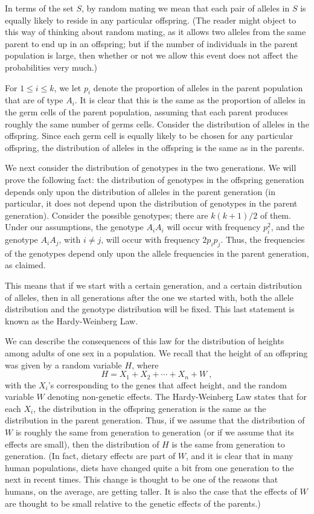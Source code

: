 In terms of the set $S$, by random mating we mean that each pair of alleles in $S$ is equally
likely to reside in any particular offspring.  (The reader might object to this way of thinking
about random mating, as it allows two alleles from the same parent to end up in an offspring; but
if the number of individuals in the parent population is large, then whether or not we allow this
event does not affect the probabilities very much.)  
\par
For $1 \le i \le k$, we let $p_i$ denote the proportion of alleles in the parent population that
are of type $A_i$.  It is clear that this is the same as the proportion of alleles in the germ
cells of the parent population, assuming that each parent produces roughly the same number of
germs cells.  Consider the distribution of alleles in the offspring.  Since each germ cell is
equally likely to be chosen for any particular offspring, the distribution of alleles in the
offspring is the same as in the parents.
\par
We next consider the distribution of genotypes in the two generations.  We will prove the
following fact:  the distribution of genotypes in the offspring generation depends only upon the
distribution of alleles in the parent generation (in particular, it does not depend upon the
distribution of genotypes in the parent generation).  Consider the possible genotypes; there are
$k(k+1)/2$ of them.  Under our assumptions, the genotype $A_iA_i$ will occur with frequency
$p_i^2$, and the genotype $A_iA_j$, with $i \ne j$, will occur with frequency $2p_ip_j$.  Thus,
the frequencies of the genotypes depend only upon the allele frequencies in the parent generation,
as claimed.
\par
This means that if we start with a certain generation, and a certain distribution of alleles, then
in all generations after the one we started with, both the allele distribution and the genotype
distribution will be fixed.  This last statement is known as the
Hardy-Weinberg Law.  
\par
We can describe the consequences of this law for the
distribution of heights among adults of one sex in a population.  We recall that the height of an
offspring was given by a random variable $H$, where
$$H = X_1 + X_2 + \cdots + X_n + W\ ,$$
with the $X_i$'s corresponding to the genes that affect height, and the random variable $W$
denoting non-genetic effects.  The Hardy-Weinberg Law states that for each $X_i$, the
distribution in the offspring generation is the same as the distribution in the parent
generation.  Thus, if we assume that the distribution of $W$ is roughly the same from generation
to generation (or if we assume that its effects are small), then the distribution of $H$ is the
same from generation to generation.  (In fact, dietary effects are part of $W$, and it is
clear that in many human populations, diets have changed quite a bit from one generation to the
next in recent times.  This change is thought to be one of the reasons that humans, on the
average, are getting taller.  It is also the case that the effects of $W$ are thought to be small
relative to the genetic effects of the parents.)

